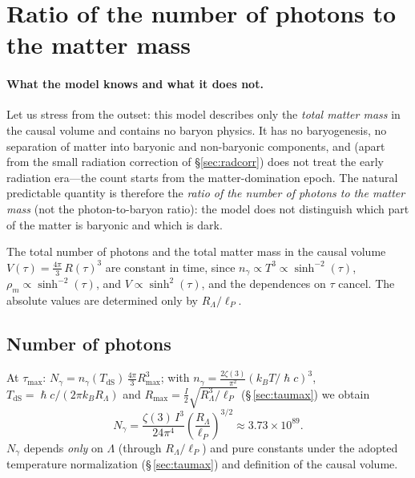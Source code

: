 \documentclass[10pt,a4paper]{article}
\DeclareRobustCommand{\hbar}{\hslash}
\begin{document}
\section{Ratio of the number of photons to the matter mass}
\label{sec:photon_matter}

\paragraph{What the model knows and what it does not.} Let us stress from the outset: this model describes only the \emph{total matter mass} in the causal volume and contains no baryon physics. It has no baryogenesis, no separation of matter into baryonic and non-baryonic components, and (apart from the small radiation correction of \S\ref{sec:radcorr}) does not treat the early radiation era---the count starts from the matter-domination epoch. The natural predictable quantity is therefore the \emph{ratio of the number of photons to the matter mass} (not the photon-to-baryon ratio): the model does not distinguish which part of the matter is baryonic and which is dark.

The total number of photons and the total matter mass in the causal volume $V(\tau) = \frac{4\pi}{3}\,R(\tau)^3$ are constant in time, since $n_\gamma\propto T^3\propto\sinh^{-2}(\tau)$, $\rho_m\propto\sinh^{-2}(\tau)$, and $V\propto\sinh^2(\tau)$, and the dependences on $\tau$ cancel. The absolute values are determined only by $R_\Lambda/\ell_P$.

\subsection{Number of photons}
At $\tau_{\max}$: $N_\gamma=n_\gamma(T_{\mathrm{dS}})\,\tfrac{4\pi}{3}R_{\max}^3$; with $n_\gamma=\tfrac{2\zeta(3)}{\pi^2}(k_BT/\hbar c)^3$, $T_{\mathrm{dS}}=\hbar c/(2\pi k_B R_\Lambda)$ and $R_{\max}=\tfrac{I}{2}\sqrt{R_\Lambda^3/\ell_P}$ (\S\,\ref{sec:taumax}) we obtain
\begin{equation}
\boxed{N_\gamma = \frac{\zeta(3)\,I^3}{24\pi^4} \left(\frac{R_\Lambda}{\ell_P}\right)^{3/2} \approx 3.73 \times 10^{89}.} \label{eq:n_gamma}
\end{equation}
$N_\gamma$ depends \emph{only} on $\Lambda$ (through $R_\Lambda/\ell_P$) and pure constants under the adopted temperature normalization (\S\,\ref{sec:taumax}) and definition of the causal volume.
\end{document}
